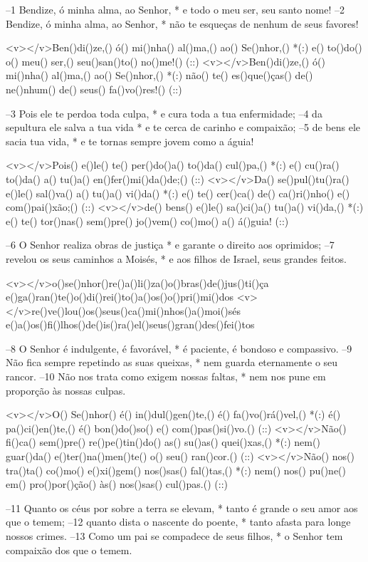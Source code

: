 –1 Bendize, ó minha alma, ao Senhor, *
e todo o meu ser, seu santo nome!
–2 Bendize, ó minha alma, ao Senhor, *
não te esqueças de nenhum de seus favores!

<v></v>Ben()di()ze,() ó() mi()nha() al()ma,() ao() Se()nhor,() *(:)
e() to()do() o() meu() ser,() seu()san()to() no()me!() (::)
<v></v>Ben()di()ze,() ó() mi()nha() al()ma,() ao() Se()nhor,() *(:)
não() te() es()que()ças() de() ne()nhum() de() seus() fa()vo()res!() (::)

–3 Pois ele te perdoa toda culpa, *
e cura toda a tua enfermidade;
–4 da sepultura ele salva a tua vida *
e te cerca de carinho e compaixão;
–5 de bens ele sacia tua vida, *
e te tornas sempre jovem como a águia!

<v></v>Pois() e()le() te() per()do()a() to()da() cul()pa,() *(:)
e() cu()ra() to()da() a() tu()a() en()fer()mi()da()de;() (::)
<v></v>Da() se()pul()tu()ra() e()le() sal()va() a() tu()a() vi()da() *(:)
e() te() cer()ca() de() ca()ri()nho() e() com()pai()xão;() (::)
<v></v>de() bens() e()le() sa()ci()a() tu()a() vi()da,() *(:)
e() te() tor()nas() sem()pre() jo()vem() co()mo() a() á()guia! (::)

–6 O Senhor realiza obras de justiça *
e garante o direito aos oprimidos;
–7 revelou os seus caminhos a Moisés, *
e aos filhos de Israel, seus grandes feitos.

<v></v>o()se()nhor()re()a()li()za()o()bras()de()jus()ti()ça
e()ga()ran()te()o()di()rei()to()a()os()o()pri()mi()dos
<v></v>re()ve()lou()os()seus()ca()mi()nhos()a()moi()sés
e()a()os()fi()lhos()de()is()ra()el()seus()gran()des()fei()tos

–8 O Senhor é indulgente, é favorável, *
é paciente, é bondoso e compassivo.
–9 Não fica sempre repetindo as suas queixas, *
nem guarda eternamente o seu rancor.
–10 Não nos trata como exigem nossas faltas, *
nem nos pune em proporção às nossas culpas.

<v></v>O() Se()nhor() é() in()dul()gen()te,() é() fa()vo()rá()vel,() *(:)
é() pa()ci()en()te,() é() bon()do()so() e() com()pas()si()vo.() (::)
<v></v>Não() fi()ca() sem()pre() re()pe()tin()do() as() su()as() quei()xas,() *(:)
nem() guar()da() e()ter()na()men()te() o() seu() ran()cor.() (::)
<v></v>Não() nos() tra()ta() co()mo() e()xi()gem() nos()sas() fal()tas,() *(:)
nem() nos() pu()ne() em() pro()por()ção() às() nos()sas() cul()pas.() (::)

–11 Quanto os céus por sobre a terra se elevam, *
tanto é grande o seu amor aos que o temem;
–12 quanto dista o nascente do poente, *
tanto afasta para longe nossos crimes.
–13 Como um pai se compadece de seus filhos, *
o Senhor tem compaixão dos que o temem.

